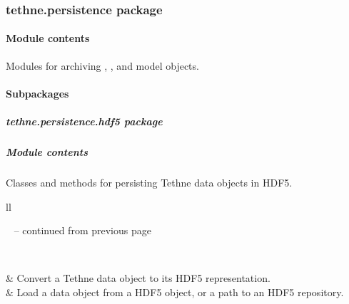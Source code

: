 \documentclass[letterpaper,10pt,english]{sphinxmanual}
\begin{document}
\subsubsection{tethne.persistence package}
\label{tethne.persistence::doc}\label{tethne.persistence:tethne-persistence-package}

\paragraph{Module contents}
\label{tethne.persistence:module-contents}\label{tethne.persistence:module-tethne.persistence}
Modules for archiving {\hyperref[tethne.classes.corpus:tethne.classes.corpus.Corpus]{}}, {\hyperref[tethne.classes.graphcollection:tethne.classes.graphcollection.GraphCollection]{}}, and 
model objects.


\paragraph{Subpackages}
\label{tethne.persistence:subpackages}

\subparagraph{tethne.persistence.hdf5 package}
\label{tethne.persistence.hdf5:tethne-persistence-hdf5-package}\label{tethne.persistence.hdf5::doc}

\subparagraph{Module contents}
\label{tethne.persistence.hdf5:module-contents}\label{tethne.persistence.hdf5:module-tethne.persistence.hdf5}
Classes and methods for persisting Tethne data objects in HDF5.

\begin{longtable}{ll}
\hline
\endfirsthead

%
{{\textsf{\tablename\ \thetable{} -- continued from previous page}}} \\
\hline
\endhead

\hline {} \\ \hline
\endfoot

\endlastfoot


{\hyperref[tethne.persistence.hdf5:tethne.persistence.hdf5.to_hdf5]{}}
 & 
Convert a Tethne data object to its HDF5 representation.
\\

{\hyperref[tethne.persistence.hdf5:tethne.persistence.hdf5.from_hdf5]{}}
 & 
Load a data object from a HDF5 object, or a path to an HDF5 repository.
\\
\hline\end{longtable}
\end{document}
